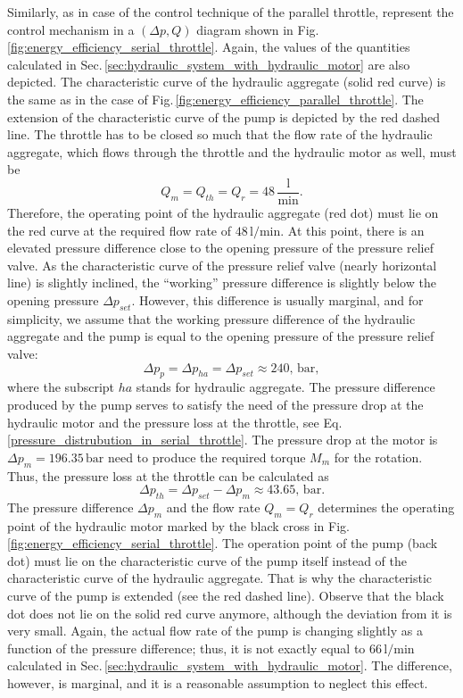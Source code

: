 Similarly, as in case of the control technique of the parallel throttle, represent the control mechanism in a $(\Delta p, Q)$ diagram shown in Fig.\,\ref{fig:energy_efficiency_serial_throttle}. Again, the values of the quantities calculated in Sec.\,\ref{sec:hydraulic_system_with_hydraulic_motor} are also depicted. The characteristic curve of the hydraulic aggregate (solid red curve) is the same as in the case of Fig.\,\ref{fig:energy_efficiency_parallel_throttle}. The extension of the characteristic curve of the pump is depicted by the red dashed line. The throttle has to be closed so much that the flow rate of the hydraulic aggregate, which flows through the throttle and the hydraulic motor as well, must be
%
\begin{equation}
Q_m = Q_{th} = Q_r = 48\,\mathrm{\frac{l}{min}}.
\end{equation}
%
Therefore, the operating point of the hydraulic aggregate (red dot) must lie on the red curve at the required flow rate of $48\,\mathrm{l/min}$. At this point, there is an elevated pressure difference close to the opening pressure of the pressure relief valve. As the characteristic curve of the pressure relief valve (nearly horizontal line) is slightly inclined, the ``working'' pressure difference is slightly below the opening pressure $\Delta p_{set}$. However, this difference is usually marginal, and for simplicity, we assume that the working pressure difference of the hydraulic aggregate and the pump is equal to the opening pressure of the pressure relief valve:
%
\begin{equation}
\Delta p_p = \Delta p_{ha} = \Delta p_{set} \approx 240,\,\mathrm{bar},
\end{equation}
%
where the subscript $ha$ stands for hydraulic aggregate. The pressure difference produced by the pump serves to satisfy the need of the pressure drop at the hydraulic motor and the pressure loss at the throttle, see Eq.\,\eqref{pressure_distrubution_in_serial_throttle}. The pressure drop at the motor is $\Delta p_m = 196.35\,\mathrm{bar}$ need to produce the required torque $M_m$ for the rotation. Thus, the pressure loss at the throttle can be calculated as
%
\begin{equation}
\Delta p_{th} = \Delta p_{set} - \Delta p_m \approx 43.65,\,\mathrm{bar}.
\end{equation}
%
The pressure difference $\Delta p_m$ and the flow rate $Q_m=Q_r$ determines the operating point of the hydraulic motor marked by the black cross in Fig.\,\ref{fig:energy_efficiency_serial_throttle}. The operation point of the pump (back dot) must lie on the characteristic curve of the pump itself instead of the characteristic curve of the hydraulic aggregate. That is why the characteristic curve of the pump is extended (see the red dashed line). Observe that the black dot does not lie on the solid red curve anymore, although the deviation from it is very small. Again, the actual flow rate of the pump is changing slightly as a function of the pressure difference; thus, it is not exactly equal to $66\,\mathrm{l/min}$ calculated in Sec.\,\ref{sec:hydraulic_system_with_hydraulic_motor}. The difference, however, is marginal, and it is a reasonable assumption to neglect this effect.

